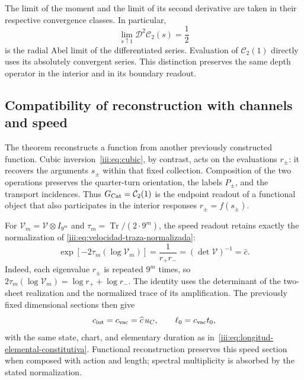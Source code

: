 The limit of the moment and the limit of its second derivative are
taken in their respective convergence classes. In particular,
\[
 \lim_{s\uparrow1}\mathcal D^2\mathcal C_2(s)=\frac12
\]
is the radial Abel limit of the differentiated series. Evaluation
of $\mathcal C_2(1)$ directly uses its absolutely convergent
series. This distinction preserves the same depth operator in
the interior and in its boundary readout.

\subsection{Compatibility of reconstruction with channels and speed}
\label{iii:sec:restitucion-canales-velocidad}

The theorem reconstructs a function from another previously constructed
function. Cubic inversion~\eqref{iii:eq:cubic}, by contrast, acts
on the evaluations $r_\pm$: it recovers the arguments $s_\pm$
within that fixed collection. Composition of the two operations preserves
the quarter-turn orientation, the labels $P_\pm$, and
the transport incidences. Thus $G_{\rm Cat}=\mathcal C_2(1)$
is the endpoint readout of a functional object that also participates
in the interior responses $r_\pm=f(s_\pm)$.

For $\mathcal V_m=\mathcal V\otimes I_{9^m}$ and
$\tau_m=\operatorname{Tr}/(2\cdot9^m)$, the speed readout
retains exactly the normalization of
\eqref{iii:eq:velocidad-traza-normalizada}:
\begin{equation}
 \exp[-2\tau_m(\log\mathcal V_m)]
   =\frac1{r_+r_-}
   =(\det\mathcal V)^{-1}=\widehat c.
 \label{iii:eq:restitucion-velocidad-normalizada}
\end{equation}
Indeed, each eigenvalue $r_\pm$ is repeated $9^m$ times, so
$2\tau_m(\log\mathcal V_m)=\log r_++\log r_-$.
The identity uses the determinant of the two-sheet realization
and the normalized trace of its amplification. The previously fixed
dimensional sections then give
\[
 c_{\rm int}=c_{\rm vac}=\widehat c\,u_C,
 \qquad \ell_0=c_{\rm vac}t_0,
\]
with the same state, chart, and elementary duration as
in~\eqref{iii:eq:longitud-elemental-constitutiva}.
Functional reconstruction preserves this speed section when
composed with action and length; spectral multiplicity is
absorbed by the stated normalization.
